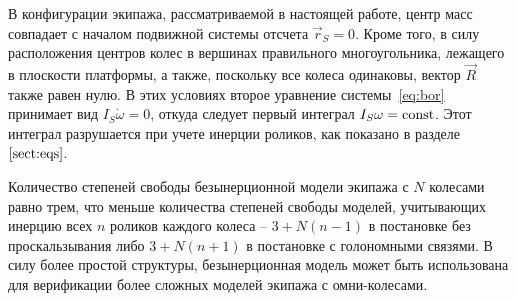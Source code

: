 
В конфигурации экипажа, рассматриваемой в настоящей работе, центр масс совпадает с началом подвижной системы отсчета $\vec{r}_S = 0$. Кроме того, в силу расположения центров колес в вершинах правильного многоугольника, лежащего в плоскости платформы, а также, поскольку все колеса одинаковы, вектор $\vec{R}$ также равен нулю. В этих условиях второе уравнение системы~\ref{eq:bor} принимает вид $I_S\dot{\omega} = 0$, откуда следует первый интеграл $I_S\omega = \mathrm{const}$. Этот интеграл разрушается при учете инерции роликов, как показано в разделе~$\ref{sect:eqs}$.

Количество степеней свободы безынерционной модели экипажа с $N$ колесами равно трем, что меньше количества степеней свободы моделей, учитывающих инерцию всех $n$ роликов каждого колеса -- $3 + N(n - 1)$ в постановке без проскальзывания либо $3 + N(n + 1)$ в постановке с голономными связями. В силу более простой структуры, безынерционная модель может быть использована для верификации более сложных моделей экипажа с омни-колесами.